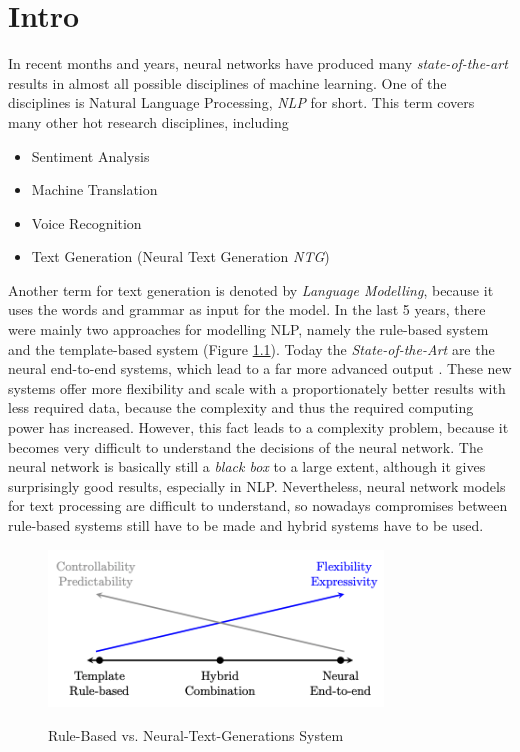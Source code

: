 \chapter{Intro}\label{ch:intro}

In recent months and years, neural networks have produced many \textit{state-of-the-art} results in almost all possible disciplines of machine learning. One of the disciplines is Natural Language Processing, \textit{NLP} for short. This term covers many other hot research disciplines, including 

\begin{itemize}
\item Sentiment Analysis
\item Machine Translation
\item Voice Recognition
\item Text Generation (Neural Text Generation \textit{NTG})
\end{itemize}

Another term for text generation is denoted by \textit{Language Modelling}, because it uses the words and grammar as input for the model. In the last 5 years, there were mainly two approaches for modelling NLP, namely the rule-based system and the template-based system (Figure \ref{rules_based}). Today the \textit{State-of-the-Art} are the neural end-to-end systems, which lead to a far more advanced output \cite{End_to_End}. These new systems offer more flexibility and scale with a proportionately better results with less required data, because the complexity and thus the required computing power has increased. However, this fact leads to a complexity problem, because it becomes very difficult to understand the decisions of the neural network. The neural network is basically still a \textit{black box} to a large extent, although it gives surprisingly good results, especially in NLP. Nevertheless, neural network models for text processing are difficult to understand, so nowadays compromises between rule-based systems still have to be made and hybrid systems have to be used. 

\begin{figure}
  \begin{center}
  \includegraphics[width=3.5in]{photos/rule_based}\\
  \caption{Rule-Based vs. Neural-Text-Generations System \cite{End_to_End}}\label{rules_based}
  \end{center}
\end{figure}

